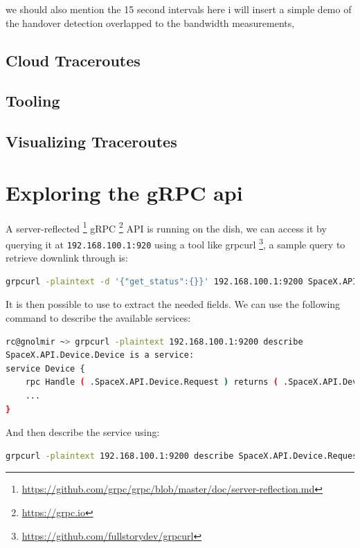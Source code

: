 \documentclass[IN,11pt,twoside,openright,bachelor,english]{tumthesis}
\begin{document}
we should also mention the 15 second intervals
here i will insert a simple demo of the handover detection overlapped to the bandwidth measurements, 

\section{Cloud Traceroutes}
\section{Tooling}
\section{Visualizing Traceroutes}

\chapter{Exploring the gRPC api}

A server-reflected \footnote{\url{https://github.com/grpc/grpc/blob/master/doc/server-reflection.md}} gRPC
\footnote{\url{https://grpc.io}} API is running on the dish, we can access it by querying it at \texttt{192.168.100.1:920} using a tool like grpcurl \footnote{\url{https://github.com/fullstorydev/grpcurl}}, a sample query to retrieve downlink through is:

\begin{lstlisting}[language=bash,basicstyle=\tiny]
grpcurl -plaintext -d '{"get_status":{}}' 192.168.100.1:9200 SpaceX.API.Device.Device/Handle
\end{lstlisting}

It is then possible to use  to extract the needed fields. We can use the following command to describe the available services:

\begin{lstlisting}[language=bash,basicstyle=\tiny]
rc@gnolmir ~> grpcurl -plaintext 192.168.100.1:9200 describe
SpaceX.API.Device.Device is a service:
service Device {
	rpc Handle ( .SpaceX.API.Device.Request ) returns ( .SpaceX.API.Device.Response );
	...
}
\end{lstlisting}

And then describe the service using:

\begin{lstlisting}[language=bash,basicstyle=\tiny]
grpcurl -plaintext 192.168.100.1:9200 describe SpaceX.API.Device.Request
\end{lstlisting}
\end{document}
